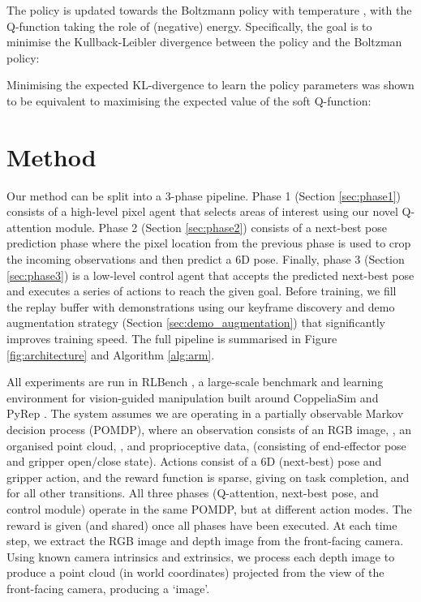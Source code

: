 \documentclass[letterpaper, 10 pt, journal, twoside]{IEEEtran}
\begin{document}
The policy is updated towards the Boltzmann policy with temperature , with the Q-function taking the role of (negative) energy. Specifically, the goal is to minimise the Kullback-Leibler divergence between the policy and the Boltzman policy:


Minimising the expected KL-divergence to learn the policy parameters was shown to be equivalent to maximising the expected value of the soft Q-function:


\section{Method}

Our method can be split into a 3-phase pipeline. Phase 1 (Section \ref{sec:phase1}) consists of a high-level pixel agent that selects areas of interest using our novel Q-attention module. Phase 2 (Section \ref{sec:phase2}) consists of a next-best pose prediction phase where the pixel location from the previous phase is used to crop the incoming observations and then predict a 6D pose. Finally, phase 3 (Section \ref{sec:phase3}) is a low-level control agent that accepts the predicted next-best pose and executes a series of actions to reach the given goal. Before training, we fill the replay buffer with demonstrations using our keyframe discovery and demo augmentation strategy (Section \ref{sec:demo_augmentation}) that significantly improves training speed. The full pipeline is summarised in Figure \ref{fig:architecture} and Algorithm \ref{alg:arm}.

All experiments are run in RLBench \cite{james2019rlbench}, a large-scale benchmark and learning environment for vision-guided manipulation built around CoppeliaSim \cite{rohmer2013v} and PyRep \cite{james2019pyrep}. The system assumes we are operating in a partially observable Markov decision process (POMDP), where an observation  consists of an RGB image, , an organised point cloud, , and proprioceptive data,  (consisting of end-effector pose and gripper open/close state). Actions consist of a 6D (next-best) pose and gripper action, and the reward function is sparse, giving  on task completion, and  for all other transitions. All three phases (Q-attention, next-best pose, and control module) operate in the same POMDP, but at different action modes. The reward is given (and shared) once all phases have been executed.
At each time step, we extract the RGB image  and depth image  from the front-facing camera. Using known camera intrinsics and extrinsics, we process each depth image to produce a point cloud  (in world coordinates) projected from the view of the front-facing camera, producing a  `image'.
\end{document}
